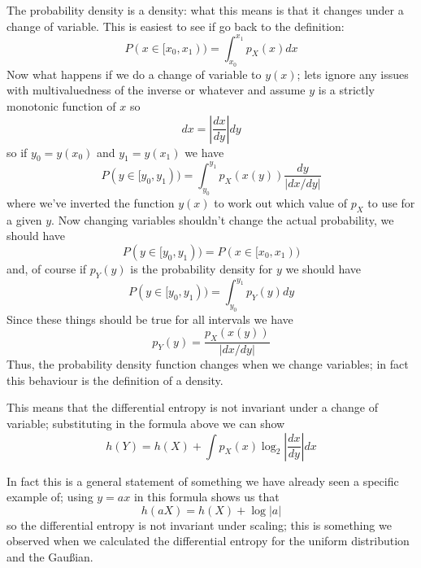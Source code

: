 \documentclass[12pt]{article}
\begin{document}
The probability density is a density: what this means is that it
changes under a change of variable. This is easiest to see if go back to the definition:
\begin{equation}
  P(x\in[x_0,x_1))=\int_{x_0}^{x_1}p_X(x)dx
\end{equation}
Now what happens if we do a change of variable to $y(x)$; lets ignore
any issues with multivaluedness of the inverse or whatever and assume
$y$ is a strictly monotonic function of $x$ so
\begin{equation}
  dx=\left|\frac{dx}{dy}\right|dy
\end{equation}
so if $y_0=y(x_0)$ and $y_1=y(x_1)$ we have
\begin{equation}
  P(y\in[y_0,y_1))=\int_{y_0}^{y_1} p_X(x(y))\frac{dy}{|dx/dy|}
\end{equation}
where we've inverted the function $y(x)$ to work out which value of
$p_X$ to use for a given $y$. Now changing variables shouldn't change
the actual probability, we should have
\begin{equation}
  P(y\in[y_0,y_1))=  P(x\in[x_0,x_1))
\end{equation}
and, of course if $p_Y(y)$ is the probability density for $y$ we should have 
\begin{equation}
  P(y\in[y_0,y_1))=\int_{y_0}^{y_1} p_Y(y)dy
\end{equation}
Since these things should be true for all intervals we have
\begin{equation}
  p_Y(y)=\frac{p_X(x(y))}{|dx/dy|}
\end{equation}
Thus, the probability density function changes when we change
variables; in fact this behaviour is the definition of a density.

This means that the differential entropy is not invariant under a change of variable; substituting in the formula above we can show
\begin{equation}
  h(Y)=h(X)+\int p_X(x) \log_2\left|\frac{dx}{dy}\right|dx
\end{equation}

In fact this is a general statement of something we have already seen
a specific example of; using $y=a x$ in this formula shows us that
\begin{equation}
  h(aX)=h(X)+\log{|a|}
\end{equation}
so the differential entropy is not invariant under scaling; this is
something we observed when we calculated the differential entropy for
the uniform distribution and the Gau{\ss}ian.
\end{document}
